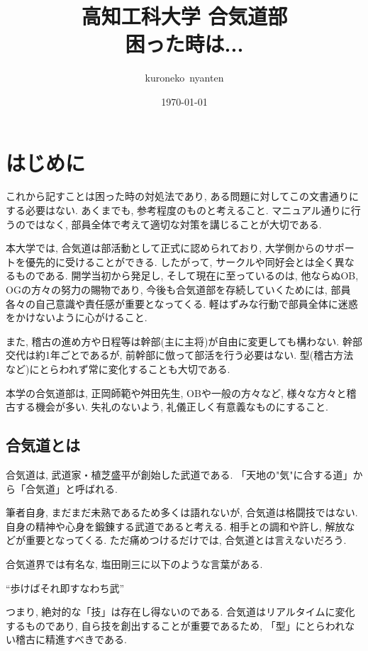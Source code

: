 \documentclass[a4j,titlepage]{jarticle}
\title{高知工科大学 合気道部 \\ 困った時は...}
\author{kuroneko~nyanten}
\date{\today}
\begin{document}
\maketitle
\tableofcontents
\clearpage


\section{はじめに}
これから記すことは困った時の対処法であり, ある問題に対してこの文書通りにする必要はない. あくまでも, 参考程度のものと考えること. マニュアル通りに行うのではなく, 部員全体で考えて適切な対策を講じることが大切である. \par
本大学では, 合気道は部活動として正式に認められており, 大学側からのサポートを優先的に受けることができる. したがって, サークルや同好会とは全く異なるものである. 開学当初から発足し, そして現在に至っているのは, 他ならぬOB, OGの方々の努力の賜物であり, 今後も合気道部を存続していくためには, 部員各々の自己意識や責任感が重要となってくる. 軽はずみな行動で部員全体に迷惑をかけないように心がけること. \par
また, 稽古の進め方や日程等は幹部(主に主将)が自由に変更しても構わない. 幹部交代は約1年ごとであるが, 前幹部に倣って部活を行う必要はない. 型(稽古方法など)にとらわれず常に変化することも大切である. \par
本学の合気道部は, 正岡師範や舛田先生, OBや一般の方々など, 様々な方々と稽古する機会が多い. 失礼のないよう, 礼儀正しく有意義なものにすること.

\subsection{合気道とは}
合気道は, 武道家・植芝盛平が創始した武道である. 「天地の"気"に合する道」から「合気道」と呼ばれる. \par
筆者自身, まだまだ未熟であるため多くは語れないが, 合気道は格闘技ではない. 自身の精神や心身を鍛錬する武道であると考える. 相手との調和や許し, 解放などが重要となってくる. ただ痛めつけるだけでは, 合気道とは言えないだろう. \par
合気道界では有名な, 塩田剛三に以下のような言葉がある. \par

\vspace{0.2in}
\begin{center}
   “歩けばそれ即すなわち武”
\end{center}
\vspace{0.2in}

つまり, 絶対的な「技」は存在し得ないのである. 合気道はリアルタイムに変化するものであり, 自ら技を創出することが重要であるため, 「型」にとらわれない稽古に精進すべきである.
\end{document}
